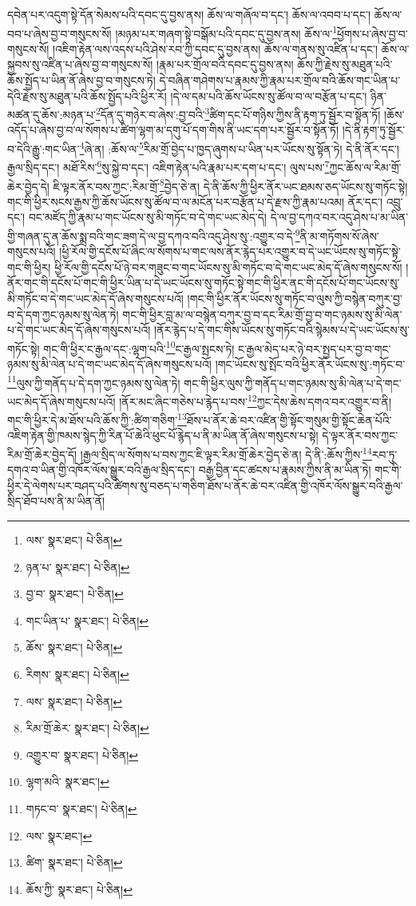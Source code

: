 དབེན་པར་འདུག་སྟེ་དོན་སེམས་པའི་དབང་དུ་བྱས་ནས། ཆོས་ལ་གཞོལ་བ་དང་། ཆོས་ལ་འབབ་པ་དང་། ཆོས་ལ་བབ་པ་ཞེས་བྱ་བ་གསུངས་སོ། །མཉམ་པར་གཞག་སྟེ་བསྒོམ་པའི་དབང་དུ་བྱས་ནས། ཆོས་ལ་\footnote{ལས་  སྣར་ཐང་།  པེ་ཅིན། }ཕྱོགས་པ་ཞེས་བྱ་བ་གསུངས་སོ། །འཇིག་རྟེན་ལས་འདས་པའི་ཤེས་རབ་ཀྱི་དབང་དུ་བྱས་ནས། ཆོས་ལ་གནས་སུ་འཛིན་པ་དང་། ཆོས་ལ་སྐྱབས་སུ་འཛིན་པ་ཞེས་བྱ་བ་གསུངས་སོ། །རྣམ་པར་གྲོལ་བའི་དབང་དུ་བྱས་ནས། ཆོས་ཀྱི་རྗེས་སུ་མཐུན་པའི་ཆོས་སྤྱོད་པ་ཡིན་ནོ་ཞེས་བྱ་བ་གསུངས་ཏེ། དེ་བཞིན་གཤེགས་པ་རྣམས་ཀྱི་རྣམ་པར་གྲོལ་བའི་ཆོས་གང་ཡིན་པ་དེའི་རྗེས་སུ་མཐུན་པའི་ཆོས་སྤྱོད་པའི་ཕྱིར་རོ། །དེ་ལ་དམ་པའི་ཆོས་ཡོངས་སུ་ཚོལ་བ་ལ་བརྩོན་པ་དང་། ཉིན་མཚན་དུ་ཆོས་:མཉན་པ་\footnote{ཉན་པ་  སྣར་ཐང་།  པེ་ཅིན། }དོན་དུ་གཉེར་བ་ཞེས་:བྱ་བའི་\footnote{བྱ་བ་  སྣར་ཐང་།  པེ་ཅིན། }ཚིག་དང་པོ་གཉིས་ཀྱིས་ནི་རྟག་ཏུ་སྦྱོར་བ་སྟོན་ཏོ། །ཆོས་འདོད་པ་ཞེས་བྱ་བ་ལ་སོགས་པ་ཚིག་ལྷག་མ་དགུ་པོ་དག་གིས་ནི་ཡང་དག་པར་སྦྱོར་བ་སྟོན་ཏོ། །དེ་ནི་རྟག་ཏུ་སྦྱོར་བ་དེའི་རྒྱུ་:གང་ཡིན་\footnote{གང་ཡིན་པ་  སྣར་ཐང་།  པེ་ཅིན། }ཞེ་ན། :ཆོས་ལ་\footnote{ཆོས་  སྣར་ཐང་།  པེ་ཅིན། }རིམ་གྲོ་བྱེད་པ་ཁྱད་ཞུགས་པ་ཡིན་པར་ཡོངས་སུ་སྟོན་ཏེ། དེ་ནི་ནོར་དང་། རྒྱལ་སྲིད་དང་། མཐོ་རིས་\footnote{རིགས་  སྣར་ཐང་།  པེ་ཅིན། }སུ་སྐྱེ་བ་དང་། འཇིག་རྟེན་པའི་རྣམ་པར་དག་པ་དང་། ལུས་པས་\footnote{ལས་  སྣར་ཐང་།  པེ་ཅིན། }ཀྱང་ཆོས་ལ་རིམ་གྲོ་ཆེར་བྱེད་དེ། ཇི་ལྟར་ནོར་བས་ཀྱང་:རིམ་གྲོ་\footnote{རིམ་གྲོ་ཆེར་  སྣར་ཐང་།  པེ་ཅིན། }བྱེད་ཅེ་ན། དེ་ནི་ཆོས་ཀྱི་ཕྱིར་ནོར་ཡང་ཐམས་ཅད་ཡོངས་སུ་གཏོང་སྟེ། གང་གི་ཕྱིར་སངས་རྒྱས་ཀྱི་ཆོས་ཡོངས་སུ་ཚོལ་བ་ལ་མངོན་པར་བརྩོན་པ་དེ་རྫས་ཀྱི་རྣམ་པའམ། ནོར་དང་། འབྲུ་དང་། བང་མཛོད་ཀྱི་རྣམ་པ་གང་ཡོངས་སུ་མི་གཏོང་བ་དེ་གང་ཡང་མེད་དེ། དེ་ལ་བྱ་དཀའ་བར་འདུ་ཤེས་པ་མ་ཡིན་གྱི་གཞན་དུ་ན་ཆོས་སྨྲ་བའི་གང་ཟག་དེ་ལ་བྱ་དཀའ་བའི་འདུ་ཤེས་སུ་:འགྱུར་བ་དེ་\footnote{འགྱུར་བ་  སྣར་ཐང་།  པེ་ཅིན། }ནི་མ་གཏོགས་སོ་ཞེས་གསུངས་པའོ། །ཕྱི་རོལ་གྱི་དངོས་པོ་ཞིང་ལ་སོགས་པ་གང་ལས་ནོར་རྙེད་པར་འགྱུར་བ་དེ་ཡང་ཡོངས་སུ་གཏོང་སྟེ་གང་གི་ཕྱིར། ཕྱི་རོལ་གྱི་དངོས་པོ་ཉེ་བར་གཟུང་བ་གང་ཡོངས་སུ་མི་གཏོང་བ་དེ་གང་ཡང་མེད་དོ་ཞེས་གསུངས་སོ། །ནོར་གང་གི་དངོས་པོ་གང་གི་ཕྱིར་ཡིན་པ་དེ་ཡང་ཡོངས་སུ་གཏོང་སྟེ་གང་གི་ཕྱིར་ནང་གི་དངོས་པོ་གང་ཡོངས་སུ་མི་གཏོང་བ་དེ་གང་ཡང་མེད་དོ་ཞེས་གསུངས་པའོ། །གང་གི་ཕྱིར་ནོར་ཡོངས་སུ་གཏོང་བ་ལུས་ཀྱི་བསྙེན་བཀུར་བྱ་བ་དེ་དག་ཀྱང་ཉམས་སུ་ལེན་ཏེ། གང་གི་ཕྱིར་བླ་མ་ལ་བསྙེན་བཀུར་བྱ་བ་དང་རིམ་གྲོ་བྱ་བ་གང་ཉམས་སུ་མི་ལེན་པ་དེ་གང་ཡང་མེད་དོ་ཞེས་གསུངས་པའོ། །ནོར་རྙེད་པ་དེ་གང་གིས་ཡོངས་སུ་གཏོང་བའི་སྙེམས་པ་དེ་ཡང་ཡོངས་སུ་གཏོང་སྟེ། གང་གི་ཕྱིར་ང་རྒྱལ་དང་:ལྷག་པའི་\footnote{ལྷག་མའི་  སྣར་ཐང་། }ང་རྒྱལ་སྤངས་ཏེ། ང་རྒྱལ་མེད་པར་ཉེ་བར་སྤྱད་པར་བྱ་བ་གང་ཉམས་སུ་མི་ལེན་པ་དེ་གང་ཡང་མེད་དོ་ཞེས་གསུངས་པའོ། །གང་ཡོངས་སུ་སྤོང་བའི་ཕྱིར་ནོར་ཡོངས་སུ་:གཏོང་བ་\footnote{གཏང་བ་  སྣར་ཐང་།  པེ་ཅིན། }ལུས་ཀྱི་གནོད་པ་དེ་དག་ཀྱང་ཉམས་སུ་ལེན་ཏེ། གང་གི་ཕྱིར་ལུས་ཀྱི་གནོད་པ་གང་ཉམས་སུ་མི་ལེན་པ་དེ་གང་ཡང་མེད་དོ་ཞེས་གསུངས་པའོ། །ནོར་མང་ཞིང་གཅེས་པ་རྙེད་པ་བས་\footnote{ལས་  སྣར་ཐང་། }ཀྱང་དེས་ཆེས་དགའ་བར་འགྱུར་བ་ནི། གང་གི་ཕྱིར་དེ་མ་ཐོས་པའི་ཆོས་ཀྱི་:ཚིག་གཅིག་\footnote{ཚིག་  སྣར་ཐང་།  པེ་ཅིན། }ཐོས་པ་ནོར་ཆེ་བར་འཛིན་གྱི་སྟོང་གསུམ་གྱི་སྟོང་ཆེན་པོའི་འཇིག་རྟེན་གྱི་ཁམས་སྙེད་ཀྱི་རིན་པོ་ཆེའི་ཕུང་པོ་རྙེད་པ་ནི་མ་ཡིན་ནོ་ཞེས་གསུངས་པ་སྟེ། དེ་ལྟར་ནོར་བས་ཀྱང་རིམ་གྲོ་ཆེར་བྱེད་དོ། །རྒྱལ་སྲིད་ལ་སོགས་པ་བས་ཀྱང་ཇི་ལྟར་རིམ་གྲོ་ཆེར་བྱེད་ཅེ་ན། དེ་ནི་:ཆོས་ཀྱིས་\footnote{ཆོས་ཀྱི་  སྣར་ཐང་།  པེ་ཅིན། }རབ་ཏུ་དགའ་བ་ཡིན་གྱི་འཁོར་ལོས་སྒྱུར་བའི་རྒྱལ་སྲིད་དང་། བརྒྱ་བྱིན་དང་ཚངས་པ་རྣམས་ཀྱིས་ནི་མ་ཡིན་ཏེ། གང་གི་ཕྱིར་དེ་ལེགས་པར་བཤད་པའི་ཚིགས་སུ་བཅད་པ་གཅིག་ཐོས་པ་ནོར་ཆེ་བར་འཛིན་གྱི་འཁོར་ལོས་སྒྱུར་བའི་རྒྱལ་སྲིད་ཐོབ་པས་ནི་མ་ཡིན་ནོ། 